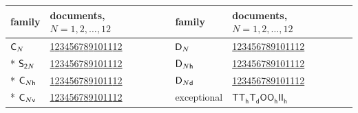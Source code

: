 \documentclass[10pt,a4paper]{article}
\numberwithin{equation}{section}
\newcommand{\grp}[1]{\mathsf{#1}}
\begin{document}
{\small\begin{longtable}{@{}ll@{\hspace{18pt}}ll@{}}\toprule
family & documents, $N = 1, 2, \dots, 12$ & family & documents, $N = 1, 2, \dots, 12$\\\midrule\endhead
\bottomrule\endfoot\endlastfoot
$\grp{C_{\mathnormal{N}}}$ & \href{C1.pdf}{1}\enspace \href{C2.pdf}{2}\enspace \href{C3.pdf}{3}\enspace \href{C4.pdf}{4}\enspace \href{C5.pdf}{5}\enspace \href{C6.pdf}{6}\enspace \href{C7.pdf}{7}\enspace \href{C8.pdf}{8}\enspace \href{C9.pdf}{9}\enspace \href{C10.pdf}{10}\enspace \href{C11.pdf}{11}\enspace \href{C12.pdf}{12} & $\grp{D_{\mathnormal{N}}}$ & \href{D1.pdf}{1}\enspace \href{D2.pdf}{2}\enspace \href{D3.pdf}{3}\enspace \href{D4.pdf}{4}\enspace \href{D5.pdf}{5}\enspace \href{D6.pdf}{6}\enspace \href{D7.pdf}{7}\enspace \href{D8.pdf}{8}\enspace \href{D9.pdf}{9}\enspace \href{D10.pdf}{10}\enspace \href{D11.pdf}{11}\enspace \href{D12.pdf}{12}\\*
$\grp{S_{2\mathnormal{N}}}$ & \href{S2.pdf}{1}\enspace \href{S4.pdf}{2}\enspace \href{S6.pdf}{3}\enspace \href{S8.pdf}{4}\enspace \href{S10.pdf}{5}\enspace \href{S12.pdf}{6}\enspace \href{S14.pdf}{7}\enspace \href{S16.pdf}{8}\enspace \href{S18.pdf}{9}\enspace \href{S20.pdf}{10}\enspace \href{S22.pdf}{11}\enspace \href{S24.pdf}{12} & $\grp{D_{\mathnormal{N}h}}$ & \href{D1h.pdf}{1}\enspace \href{D2h.pdf}{2}\enspace \href{D3h.pdf}{3}\enspace \href{D4h.pdf}{4}\enspace \href{D5h.pdf}{5}\enspace \href{D6h.pdf}{6}\enspace \href{D7h.pdf}{7}\enspace \href{D8h.pdf}{8}\enspace \href{D9h.pdf}{9}\enspace \href{D10h.pdf}{10}\enspace \href{D11h.pdf}{11}\enspace \href{D12h.pdf}{12}\\*
$\grp{C_{\mathnormal{N}h}}$ & \href{C1h.pdf}{1}\enspace \href{C2h.pdf}{2}\enspace \href{C3h.pdf}{3}\enspace \href{C4h.pdf}{4}\enspace \href{C5h.pdf}{5}\enspace \href{C6h.pdf}{6}\enspace \href{C7h.pdf}{7}\enspace \href{C8h.pdf}{8}\enspace \href{C9h.pdf}{9}\enspace \href{C10h.pdf}{10}\enspace \href{C11h.pdf}{11}\enspace \href{C12h.pdf}{12} & $\grp{D_{\mathnormal{N}d}}$ & \href{D1d.pdf}{1}\enspace \href{D2d.pdf}{2}\enspace \href{D3d.pdf}{3}\enspace \href{D4d.pdf}{4}\enspace \href{D5d.pdf}{5}\enspace \href{D6d.pdf}{6}\enspace \href{D7d.pdf}{7}\enspace \href{D8d.pdf}{8}\enspace \href{D9d.pdf}{9}\enspace \href{D10d.pdf}{10}\enspace \href{D11d.pdf}{11}\enspace \href{D12d.pdf}{12}\\*
$\grp{C_{\mathnormal{N}v}}$ & \href{C1v.pdf}{1}\enspace \href{C2v.pdf}{2}\enspace \href{C3v.pdf}{3}\enspace \href{C4v.pdf}{4}\enspace \href{C5v.pdf}{5}\enspace \href{C6v.pdf}{6}\enspace \href{C7v.pdf}{7}\enspace \href{C8v.pdf}{8}\enspace \href{C9v.pdf}{9}\enspace \href{C10v.pdf}{10}\enspace \href{C11v.pdf}{11}\enspace \href{C12v.pdf}{12} & exceptional & \href{T.pdf}{$\grp{T}$}\enspace \href{Th.pdf}{$\grp{T_{h}}$}\enspace \href{Td.pdf}{$\grp{T_{d}}$}\enspace \href{O.pdf}{$\grp{O}$}\enspace \href{Oh.pdf}{$\grp{O_{h}}$}\enspace \href{I.pdf}{$\grp{I}$}\enspace \href{Ih.pdf}{$\grp{I_{h}}$}\\
\bottomrule\end{longtable}}
\end{document}
